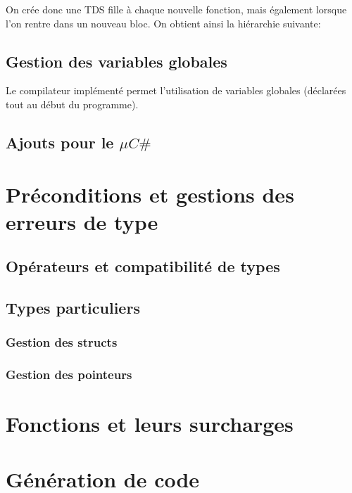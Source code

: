 \documentclass[11pt,a4paper]{report}
\begin{document}


On crée donc une TDS fille à chaque nouvelle fonction, mais également lorsque l'on rentre dans un nouveau bloc. On obtient ainsi la hiérarchie suivante: 



\subsection{Gestion des variables globales}

Le compilateur implémenté permet l'utilisation de variables globales (déclarées tout au début du programme). 

\subsection{Ajouts pour le $\mu C \#$}

\section{Préconditions et gestions des erreurs de type}

\subsection{Opérateurs et compatibilité de types}

\subsection{Types particuliers}

\subsubsection{Gestion des structs}

\subsubsection{Gestion des pointeurs}

\section{Fonctions et leurs surcharges}

\section{Génération de code}
\end{document}

